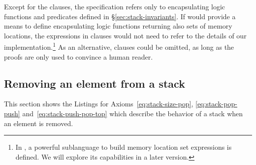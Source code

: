 

Except for the  clauses, the \acsl specification refers
only to encapsulating logic functions and predicates defined in
\S\ref{sec:stack-invariants}.
If \acsl would provide a means to define encapsulating logic
functions returning also sets of memory locations,
the expressions in  clauses would not need to refer to
the details of our
\stacktype implementation.\footnote{
In \cite[\S 2.3.4]{ACSLSpec}, a powerful sublanguage to
build memory location set expressions is defined. 
We will explore its capabilities in a later version.
}
As an alternative,  clauses could be omitted, as long as
the proofs are only used to convince a human reader.



\clearpage

\subsection{Removing an element from a stack}

This section shows the Listings for Axioms~\ref{eq:stack-size-pop}, \ref{eq:stack-pop-push}
and~\ref{eq:stack-push-pop-top} which
describe the behavior of a stack when an element is removed.





